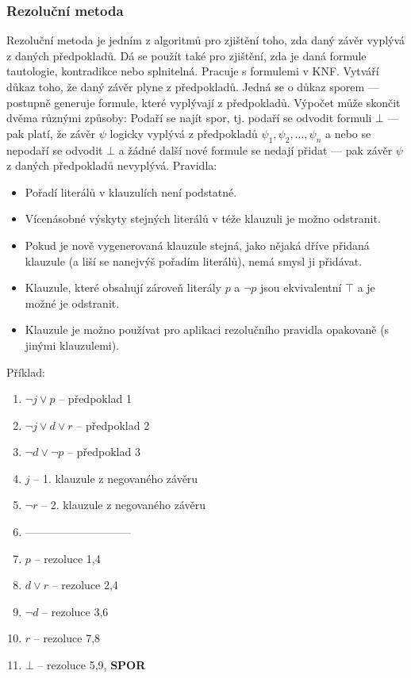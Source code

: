 \subsubsection{Rezoluční metoda}
Rezoluční metoda je jedním z algoritmů pro zjištění toho, zda daný závěr vyplývá z daných předpokladů. Dá se použít také pro zjištění, zda je daná formule tautologie, kontradikce nebo splnitelná. Pracuje s formulemi v KNF. Vytváří důkaz toho, že daný závěr plyne z předpokladů.  Jedná se o důkaz sporem — postupně generuje formule, které vyplývají z předpokladů. Výpočet může skončit dvěma různými způsoby: Podaří se najít spor, tj. podaří se odvodit formuli $\bot$ — pak platí, že závěr $\psi$ logicky vyplývá z předpokladů $\psi_1,\psi_2,\ldots ,\psi_n$ a nebo se nepodaří se odvodit $\bot$ a žádné další nové formule se nedají přidat — pak závěr $\psi$ z daných předpokladů nevyplývá.
Pravidla:
\begin{itemize}
\item Pořadí literálů v klauzulích není podstatné.
\item Vícenásobné výskyty stejných literálů v téže klauzuli je možno odstranit.
\item Pokud je nově vygenerovaná klauzule stejná, jako nějaká dříve přidaná klauzule (a liší se nanejvýš pořadím literálů), nemá smysl ji přidávat.
\item Klauzule, které obsahují zároveň literály $p$ a $\neg p$ jsou ekvivalentní $\top$ a je možné je odstranit.
\item Klauzule je možno používat pro aplikaci rezolučního pravidla opakovaně (s jinými klauzulemi).
\end{itemize}

Příklad:
\begin{enumerate}
\item $\neg j \vee p$ -- předpoklad 1
\item $\neg j \vee d \vee r$ -- předpoklad 2
\item $\neg d \vee \neg p$ -- předpoklad 3
\item $j$ -- 1. klauzule z negovaného závěru
\item $\neg r$ -- 2. klauzule z negovaného závěru
\item -----------------------------
\setcounter{enumi}{5}
\item $p$ -- rezoluce 1,4
\item $d \vee r$ -- rezoluce 2,4
\item $\neg d$ -- rezoluce 3,6
\item $r$ -- rezoluce 7,8
\item $\bot$ -- rezoluce 5,9, \textbf{SPOR}
\end{enumerate}


